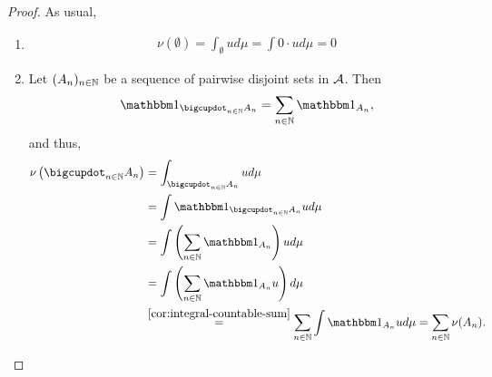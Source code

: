 \begin{proof}
	As usual,
	\begin{enumerate}
		\item
		\begin{align*}
			\nu(\emptyset) = \int_\emptyset u d\mu = \int 0 \cdot u d\mu = 0
		\end{align*}
		
		\item Let $(A_n)_{n\in\mathbb{N}}$ be a sequence of pairwise disjoint sets in $\mathcal{A}$. Then
		\begin{align*}
			\ind_{\bigcupdot_{n\in\N} A_n} = \sum_{n\in\N} \ind_{A_n},
		\end{align*}
		and thus,
		\begin{align*}
			\nu\left(\bigcupdot_{n\in\N} A_n\right)
			&= \int_{\bigcupdot_{n\in\N} A_n} u d\mu \\
			&= \int \ind_{\bigcupdot_{n\in\N} A_n} u d\mu \\
			&= \int \left(\sum_{n\in\N} \ind_{A_n}\right) u d \mu \\
			&= \int \left(\sum_{n\in\N}\ind_{A_n} u\right) d\mu \\
			&\overset{\ref{cor:integral-countable-sum}}{=} \sum_{n\in\N} \int \ind_{A_n} u d\mu
			= \sum_{n\in\N} \nu(A_n).
		\end{align*}
	\end{enumerate}
\end{proof}